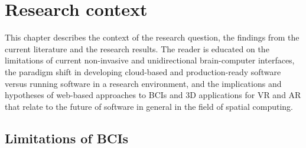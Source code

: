 \chapter{Research context}
\graphicspath{{Chapter2/Figs/}{Chapter2/Figs/}}

This chapter describes the context of the research question, the findings from the current literature and the research results. The reader is educated on the limitations of current non-invasive and unidirectional brain-computer interfaces, the paradigm shift in developing cloud-based and production-ready software versus running software in a research environment, and the implications and hypotheses of web-based approaches to BCIs and 3D applications for VR and AR that relate to the future of software in general in the field of spatial computing.

\section{Limitations of BCIs}
\label{chapter2-limitations-of-bcis}













